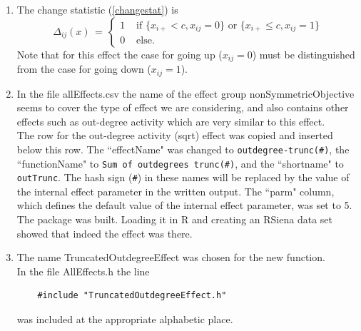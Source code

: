 \documentclass[a4paper,fleqn,11pt]{article}
\newcommand{\+}{\, + \,}
\newcommand{\sfn}[1]{\textsf{#1}}
\newcommand{\R}{{\sf R }}
\newcommand{\RS}{{\sf RSiena }}
\begin{document}
{\begin{enumerate}
\item The change statistic (\ref{changestat}) is
      \begin{equation}
       \Delta_{ij}(x) \,=\, \left\{ \begin{array}{ll}
                   1 & \text{  if } \{x_{i+} < c,  x_{ij} = 0 \}
                     \text{ or } \{x_{i+} \leq c,  x_{ij} = 1 \} \\
                   0 & \text{  else. }
                   \end{array}         \right.  \label{outTrunc_cs}
      \end{equation}
      Note that for this effect the case for going up ($x_{ij} = 0$)
      must be distinguished from the case
      for going down ($x_{ij} = 1$).
\item In the file \textsf{allEffects.csv} the name of the
      effect group \textsf{nonSymmetricObjective} seems to cover the
      type of effect we are considering, and also contains other effects
      such as out-degree activity which are very similar to this
      effect.\\
      The row for the out-degree activity (sqrt) effect was copied
      and inserted below this row. The ``effectName" was changed to
      \texttt{outdegree-trunc(\#)}, the ``functionName" to
      \texttt{Sum of outdegrees trunc(\#)},
      and the ``shortname" to \texttt{outTrunc}.
      The hash sign (\texttt{\#}) in these names will be replaced
      by the value of the
      internal effect parameter in the written output.
      The ``parm" column, which defines
      the default value of the internal effect parameter, was set to 5.
      \\
      The package was built. Loading it in \R and creating an
      \RS data set showed that indeed the effect was there.
\item The name \sfn{TruncatedOutdegreeEffect} was chosen for the new function.\\
      In the file \textsf{AllEffects.h} the line
      \begin{verbatim}
    #include "TruncatedOutdegreeEffect.h"
      \end{verbatim}
      was included at the appropriate alphabetic place.


\end{enumerate}}
\end{document}
